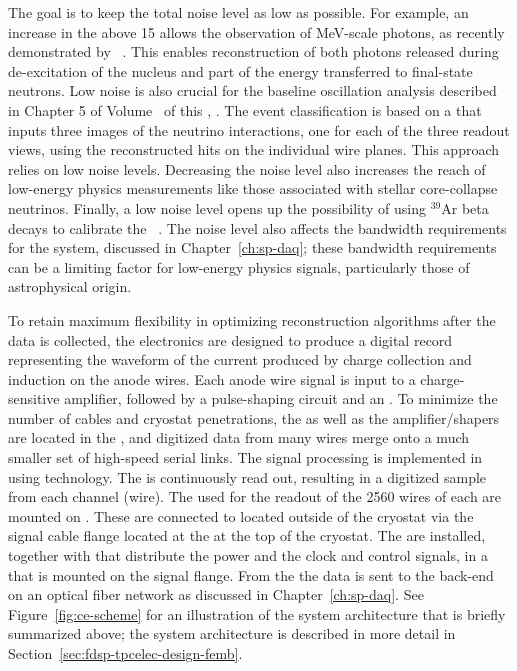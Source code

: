 The goal is to keep the total noise level as low as possible. For example, an 
increase in the  above 15 allows the observation of MeV-scale photons, 
as recently demonstrated by ~\cite{Acciarri:2018myr}. This enables  
reconstruction of both photons released during de-excitation of the nucleus and %
part
of the energy transferred to final-state neutrons. Low noise is also crucial
for the baseline oscillation analysis described in Chapter 5 of Volume~\volnumberphysics{} of this
, \voltitlephysics{}. %
The event classification is based
on %
a  that %
inputs three images
of the neutrino interactions, one for each of the three readout views, using the
reconstructed hits on the individual wire planes. This approach relies
on  low noise levels.
Decreasing the noise level also increases the reach of low-energy 
physics measurements like those associated with stellar core-collapse  neutrinos. Finally, a low noise level opens up the possibility of using 
$\mathrm{{}^{39}Ar}$ beta decays to calibrate the 
~\cite{MICROBOONE-NOTE-1050-PUB}.
The noise level also affects %
the bandwidth requirements
for the  system, %
discussed in Chapter~\ref{ch:sp-daq}; 
these bandwidth requirements can be a limiting factor for low-energy
physics signals, particularly those of astrophysical origin.

To retain maximum flexibility in optimizing reconstruction algorithms after 
the  data is collected, the  electronics are designed 
to produce a digital record representing the waveform of the current produced 
by charge collection and induction on the anode wires.  Each anode wire signal is 
input to a charge-sensitive amplifier, followed by a pulse-shaping circuit and 
an .  To minimize the number of cables and cryostat penetrations, 
the  as well as the amplifier/shapers are located in the , 
and digitized data from many wires merge onto a much smaller set of high-speed 
serial links. The  signal processing is implemented in 
using  technology.  The  is continuously 
read out, resulting in a digitized  sample from each  
channel (wire). The  used for the readout of the \num{2560}
wires of each  are mounted on . These are connected to
 located outside of the cryostat via the  signal 
cable flange located at the  \fdth at the top of the cryostat.
The  are installed, together with  that distribute
the power and the clock and control signals, in a  that is
mounted on the signal flange. From the  the data is sent to 
the  back-end on an optical fiber network as discussed in 
Chapter~\ref{ch:sp-daq}. See Figure~\ref{fig:ce-scheme} for an illustration of
the  system architecture that is briefly summarized above; the 
system architecture is described in more detail in
Section~\ref{sec:fdsp-tpcelec-design-femb}.


